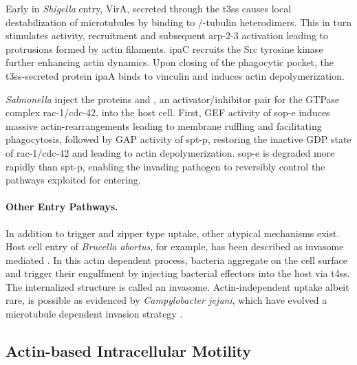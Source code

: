 
Early in \textit{Shigella} entry, VirA, secreted through the \gls{t3ss} causes local destabilization of microtubules by binding to \textalpha/\textbeta-tubulin heterodimers. This in turn stimulates  activity,  recruitment and subsequent \gls{arp-2-3} activation leading to protrusions formed by actin filaments. \Gls{ipa}C recruits the Src tyrosine kinase further enhancing actin dynamics. Upon closing of the phagocytic pocket, the \gls{t3ss}-secreted protein \gls{ipa}A binds to vinculin and induces actin depolymerization.


\textit{Salmonella} inject the proteins  and , an activator/inhibitor pair for the GTPase complex \gls{rac-1}/\gls{cdc-42}, into the host cell. First, GEF activity of \gls{sop-e} induces massive actin-rearrangements leading to membrane ruffling and facilitating phagocytosis, followed by GAP activity of \gls{spt-p}, restoring the inactive GDP state of \gls{rac-1}/\gls{cdc-42} and leading to actin depolymerization. \Gls{sop-e} is degraded more rapidly than \gls{spt-p}, enabling the invading pathogen to reversibly control the pathways exploited for entering.


\paragraph{Other Entry Pathways.}
In addition to trigger and zipper type uptake, other atypical mechanisms exist. Host cell entry of \textit{Brucella abortus}, for example, has been described as invasome mediated \citep{Dehio2005}. In this actin dependent process, bacteria aggregate on the cell surface and trigger their engulfment by injecting bacterial effectors into the host via \gls{t4ss}. The internalized structure is called an invasome. Actin-independent uptake albeit rare, is possible as evidenced by \textit{Campylobacter jejuni}, which have evolved a microtubule dependent invasion strategy \citep{Kopecko2001}.

\subsection{Actin-based Intracellular Motility}
\label{subsec:actin-motility}

